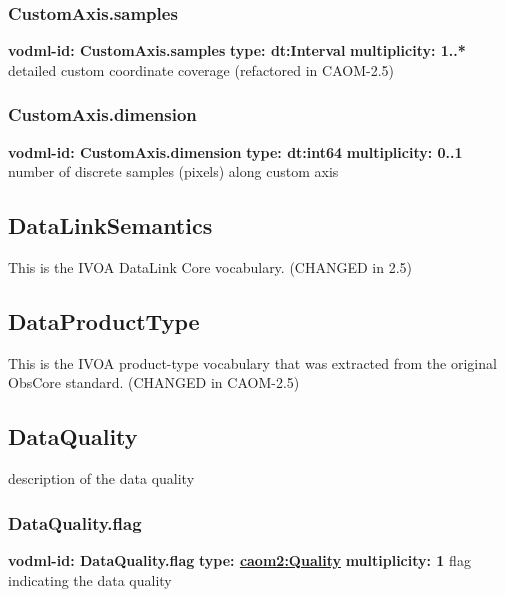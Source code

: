     \subsubsection{CustomAxis.samples}
      \textbf{vodml-id: CustomAxis.samples} \newline
      \textbf{type: dt:Interval} \newline
      \textbf{multiplicity: 1..*} \newline
      detailed custom coordinate coverage (refactored in CAOM-2.5)

    \subsubsection{CustomAxis.dimension}
      \textbf{vodml-id: CustomAxis.dimension} \newline
      \textbf{type: dt:int64} \newline
      \textbf{multiplicity: 0..1} \newline
      number of discrete samples (pixels) along custom axis

  \subsection{DataLinkSemantics}
  \label{sect:DataLinkSemantics}
    This is the IVOA DataLink Core vocabulary. (CHANGED in 2.5)

  \subsection{DataProductType}
  \label{sect:DataProductType}
    This is the IVOA product-type vocabulary that was extracted from the original ObsCore standard. (CHANGED in CAOM-2.5)

  \subsection{DataQuality}
  \label{sect:DataQuality}
    description of the data quality

    \subsubsection{DataQuality.flag}
      \textbf{vodml-id: DataQuality.flag} \newline
      \textbf{type: \hyperref[sect:Quality]{caom2:Quality}} \newline
      \textbf{multiplicity: 1} \newline
      flag indicating the data quality


